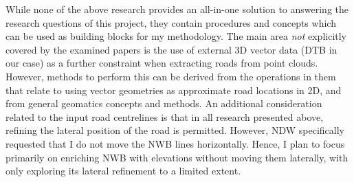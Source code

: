 While none of the above research provides an all-in-one solution to answering the research questions of this project, they contain procedures and concepts which can be used as building blocks for my methodology. The main area \textit{not} explicitly covered by the examined papers is the use of external 3D vector data (DTB in our case) as a further constraint when extracting roads from point clouds. However, methods to perform this can be derived from the operations in them that relate to using vector geometries as approximate road locations in 2D, and from general geomatics concepts and methods. An additional consideration related to the input road centrelines is that in all research presented above, refining the lateral position of the road is permitted. However, NDW specifically requested that I do not move the NWB lines horizontally. Hence, I plan to focus primarily on enriching NWB with elevations without moving them laterally, with only exploring its lateral refinement to a limited extent.